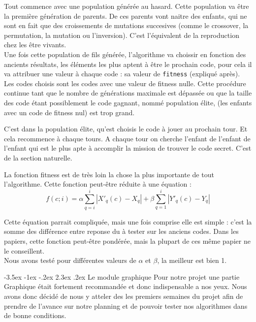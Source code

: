 \documentclass[11pt, a4paper]{article}
\makeatletter
\renewcommand{\section}{\@startsection{section}{1}{\z@}%
          {-3.5ex \@plus -1ex \@minus -.2ex}%
          {2.3ex \@plus .2ex}%
          {\reset@font\Large\bfseries	}}
\makeatother
\begin{document}
\vspace{3  mm}

Tout commence avec une population générée au hasard. Cette population va être la première génération de parents. De ces parents vont naitre des enfants, qui ne sont en fait que
des croissements de mutations succesives (comme le crossover, la permutation, la mutation ou l'inversion). C'est l'équivalent de la reproduction chez les être vivants. \\
Une fois cette population de fils générée, l'algorithme va choissir en fonction des ancients résultats, les éléments les plus aptent à être le prochain code, pour cela il va attribuer une valeur
à chaque code : sa valeur de \texttt{fitness} (expliqué après). Les codes choisis sont les codes avec une valeur de fitness nulle. Cette procédure continue tant que le nombre de générations maximale est dépassée ou que la taille des code étant possiblement le code gagnant, nommé population élite,  (les enfants avec un code de fitness nul) est trop grand.

\vspace{3  mm}

C'est dans la population élite, qu'est choisis le code à jouer au prochain tour.
Et cela recommence à chaque tours. A chaque tour on cherche l'enfant de l'enfant de l'enfant qui est le plus apte à accomplir la mission de trouver le code secret. C'est de la section naturelle.

\vspace{5  mm}

La fonction fitness est de très loin la chose la plus importante de tout l'algorithme. Cette fonction peut-être réduite à une équation :\\
\begin{equation}
f(c;i)=\alpha\sum_{q=i}^i |X'_q(c) - X_q| + \beta\sum_{q=1}^i |Y'_q(c) - Y_q|
\end{equation}

Cette équation parrait compliquée, mais une fois comprise elle est simple : c'est la somme des différence entre reponse du à tester sur les anciens codes.
Dans les papiers, cette fonction peut-être pondérée, mais la plupart de ces même papier ne le conseillent. \\
Nous avons testé pour différentes valeurs de $\alpha$ et $\beta$, la meilleur est bien 1.

\newpage
\section{Le module graphique} 
Pour notre projet une partie Graphique était fortement recommandée et donc indispensable a nos yeux. 
Nous avons donc décidé de nous y atteler des les premiers semaines du projet afin de prendre de l’avance sur notre planning et de pouvoir tester nos algorithmes dans de bonne conditions.
\end{document}
